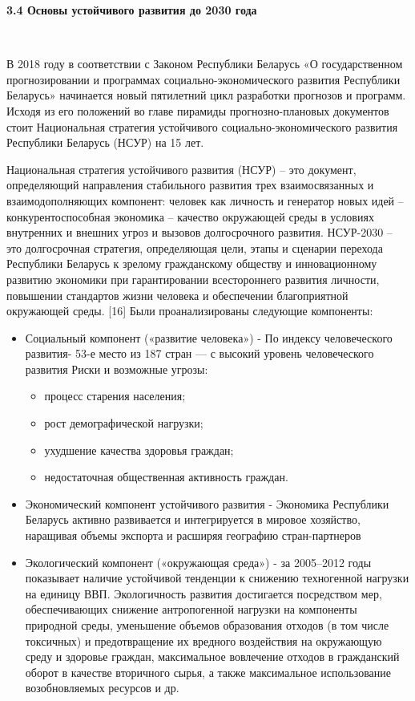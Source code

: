 \documentclass[14pt,a4paper]{article}
\begin{document}
    \begin{center}
        \textbf{3.4 Основы устойчивого развития до 2030 года}
    \end{center}
    \\
    \par
    В 2018 году в соответствии с Законом Республики Беларусь «О государственном прогнозировании и программах социально-экономического развития Республики Беларусь» начинается новый пятилетний цикл разработки прогнозов и программ. Исходя из его положений во
    главе пирамиды прогнозно-плановых документов стоит Национальная стратегия устойчивого
    социально-экономического развития Республики Беларусь (НСУР) на 15 лет.
    \par
    Национальная стратегия устойчивого развития (НСУР) – это документ, определяющий направления стабильного развития трех взаимосвязанных и взаимодополняющих компонент: человек как личность и генератор новых идей – конкурентоспособная экономика – качество окружающей среды в условиях внутренних и внешних угроз и вызовов долгосрочного развития.
    НСУР-2030 – это долгосрочная стратегия, определяющая цели, этапы и сценарии перехода Республики Беларусь к зрелому гражданскому обществу и инновационному развитию экономики при гарантировании всестороннего развития личности, повышении стандартов жизни человека и обеспечении благоприятной окружающей среды. [16]
    Были проанализированы следующие компоненты:
    \begin{itemize}
        \item Социальный компонент («развитие человека»)
        - По индексу человеческого развития- 53-е место из 187 стран --- с высокий уровень человеческого развития
        Риски и возможные угрозы:
        \begin{itemize}
            \item процесс старения населения;
            \item рост демографической нагрузки;
            \item ухудшение качества здоровья граждан;
            \item недостаточная общественная активность граждан.
        \end{itemize}
        \item Экономический компонент устойчивого развития
        - Экономика Республики Беларусь активно развивается и интегрируется в мировое хозяйство, наращивая объемы экспорта и расширяя географию стран-партнеров
        \item Экологический компонент («окружающая среда»)
        - за 2005–2012 годы показывает наличие устойчивой тенденции к снижению техногенной нагрузки на единицу ВВП.
        Экологичность развития достигается посредством мер, обеспечивающих снижение антропогенной нагрузки на компоненты природной среды, уменьшение объемов образования отходов (в том числе токсичных) и предотвращение их вредного воздействия на окружающую среду и здоровье граждан, максимальное вовлечение отходов в гражданский оборот в качестве вторичного сырья, а также максимальное использование возобновляемых ресурсов и др.
    \end{itemize}
\end{document}
